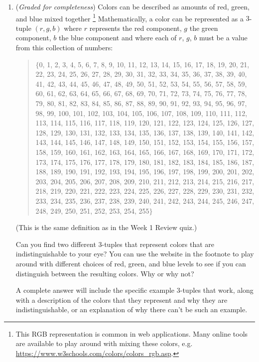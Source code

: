 \documentclass[12pt, oneside]{article}
\newcommand{\gradeComplete}{({\it Graded for completeness}) }
\begin{document}
\begin{enumerate}[labelindent=0pt, leftmargin=0pt]
\begin{enumerate}[labelindent=0pt, leftmargin=0pt]
        \item\gradeComplete 
        Colors can be described as amounts of red, green, and blue mixed together
        \footnote{This RGB representation is common in web applications.  Many online tools are available to play around with mixing these colors,  e.g. \url{https://www.w3schools.com/colors/colors_rgb.asp}. }
        Mathematically, a color can be represented as a $3$-tuple $(r, g, b)$ where $r$ represents the red component, $g$ the green component, $b$ the blue component and where each of $r$, $g$, $b$ must be a value from this collection of numbers:
        \begin{quote}
        $\{$0, 1, 2, 3, 4, 5, 6, 7, 8, 9, 10, 11, 12, 13, 14, 15, 16, 17, 18, 19, 20, 21, 22, 23, 24, 25, 26, 27, 28, 29, 30, 31, 32, 33, 34, 35, 36, 37, 38, 39, 40, 41, 42, 43, 44, 45, 46, 47, 48, 49, 50, 51, 52, 53, 54, 55, 56, 57, 58, 59, 60, 61, 62, 63, 64, 65, 66, 67, 68, 69, 70, 71, 72, 73, 74, 75, 76, 77, 78, 79, 80, 81, 82, 83, 84, 85, 86, 87, 88, 89, 90, 91, 92, 93, 94, 95, 96, 97, 98, 99, 100, 101, 102, 103, 104, 105, 106, 107, 108, 109, 110, 111, 112, 113, 114, 115, 116, 117, 118, 119, 120, 121, 122, 123, 124, 125, 126, 127, 128, 129, 130, 131, 132, 133, 134, 135, 136, 137, 138, 139, 140, 141, 142, 143, 144, 145, 146, 147, 148, 149, 150, 151, 152, 153, 154, 155, 156, 157, 158, 159, 160, 161, 162, 163, 164, 165, 166, 167, 168, 169, 170, 171, 172, 173, 174, 175, 176, 177, 178, 179, 180, 181, 182, 183, 184, 185, 186, 187, 188, 189, 190, 191, 192, 193, 194, 195, 196, 197, 198, 199, 200, 201, 202, 203, 204, 205, 206, 207, 208, 209, 210, 211, 212, 213, 214, 215, 216, 217, 218, 219, 220, 221, 222, 223, 224, 225, 226, 227, 228, 229, 230, 231, 232, 233, 234, 235, 236, 237, 238, 239, 240, 241, 242, 243, 244, 245, 246, 247, 248, 249, 250, 251, 252, 253, 254, 255$\}$
        \end{quote}
        (This is the same definition as in the Week 1 Review quiz.)
        
        Can you find two different $3$-tuples that represent colors that are indistinguishable to your eye? You can use the website in the footnote to play around
        with different choices of red, green, and blue levels to see if you can distinguish between the resulting colors.
        Why or why not? 

        A complete answer will include the specific example $3$-tuples that work, along with a description of the colors that they represent and why they
        are indistinguishable, or an explanation of why there can't be such an example.
    \end{enumerate}


\end{enumerate}
\end{document}
